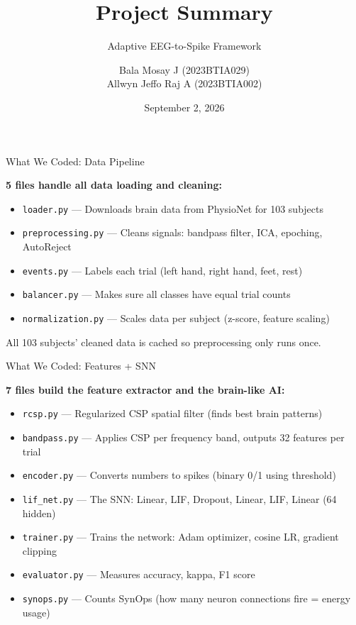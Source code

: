 \documentclass[10pt]{beamer}
\title{Project Summary}
\subtitle{Adaptive EEG-to-Spike Framework}
\author{
  Bala Mosay J \quad (2023BTIA029) \\[2pt]
  Allwyn Jeffo Raj A \quad (2023BTIA002)
}
\institute{Under the guidance of Dr.\ Vaibhav Meshram}
\date{September 2, 2026}
\begin{document}
\begin{frame}
\titlepage
\end{frame}

\begin{frame}{What We Coded: Data Pipeline}

\small
\textbf{5 files handle all data loading and cleaning:}

\vspace{4pt}
\begin{itemize}
  \item \texttt{loader.py} --- Downloads brain data from PhysioNet for 103 subjects
  \item \texttt{preprocessing.py} --- Cleans signals: bandpass filter, ICA, epoching, AutoReject
  \item \texttt{events.py} --- Labels each trial (left hand, right hand, feet, rest)
  \item \texttt{balancer.py} --- Makes sure all classes have equal trial counts
  \item \texttt{normalization.py} --- Scales data per subject (z-score, feature scaling)
\end{itemize}

\vspace{4pt}
All 103 subjects' cleaned data is cached so preprocessing only runs once.

\end{frame}

\begin{frame}{What We Coded: Features + SNN}

\small
\textbf{7 files build the feature extractor and the brain-like AI:}

\vspace{4pt}
\begin{itemize}
  \item \texttt{rcsp.py} --- Regularized CSP spatial filter (finds best brain patterns)
  \item \texttt{bandpass.py} --- Applies CSP per frequency band, outputs 32 features per trial
  \item \texttt{encoder.py} --- Converts numbers to spikes (binary 0/1 using threshold)
  \item \texttt{lif\_net.py} --- The SNN: Linear, LIF, Dropout, Linear, LIF, Linear (64 hidden)
  \item \texttt{trainer.py} --- Trains the network: Adam optimizer, cosine LR, gradient clipping
  \item \texttt{evaluator.py} --- Measures accuracy, kappa, F1 score
  \item \texttt{synops.py} --- Counts SynOps (how many neuron connections fire = energy usage)
\end{itemize}

\end{frame}
\end{document}

